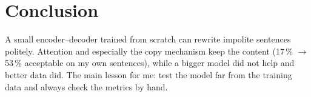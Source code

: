 \documentclass[10pt,a4paper]{article}
\begin{document}
\section{Conclusion}
A small encoder--decoder trained from scratch can rewrite impolite sentences politely. Attention and
especially the copy mechanism keep the content (17\,\% $\rightarrow$ 53\,\% acceptable on my own
sentences), while a bigger model did not help and better data did. The main lesson for me: test the
model far from the training data and always check the metrics by hand.
\end{document}
